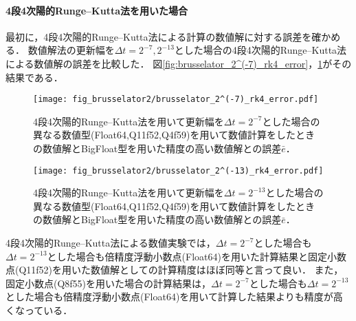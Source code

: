 \paragraph*{4段4次陽的Runge--Kutta法を用いた場合}
最初に，4段4次陽的Runge--Kutta法による計算の数値解に対する誤差を確かめる．
数値解法の更新幅を$\Delta t = 2^{-7},2^{-13}$とした場合の4段4次陽的Runge--Kutta法による数値解の誤差を比較した．
図\ref{fig:brusselator_2^(-7)_rk4_error}，\ref{fig:brusselator_2^(-13)_rk4_error}がその結果である．
\begin{figure}[H]
    \centering
    \begin{minipage}[b]{0.48\columnwidth}
        \centering
        \texttt{[image: fig\_brusselator2/brusselator\_2^(-7)\_rk4\_error.pdf]}
        \caption{4段4次陽的Runge--Kutta法を用いて更新幅を$\Delta t = 2^{-7}$とした場合の異なる数値型(Float64,Q11f52,Q4f59)を用いて数値計算をしたときの数値解とBigFloat型を用いた精度の高い数値解との誤差$\bar{e}$．}
        \label{fig:brusselator_2^(-7)_rk4_error}
    \end{minipage}
    \hspace{0.01\columnwidth}
    \begin{minipage}[b]{0.48\columnwidth}
        \centering
        \texttt{[image: fig\_brusselator2/brusselator\_2^(-13)\_rk4\_error.pdf]}
        \caption{4段4次陽的Runge--Kutta法を用いて更新幅を$\Delta t =  2^{-13}$とした場合の異なる数値型(Float64,Q11f52,Q4f59)を用いて数値計算をしたときの数値解とBigFloat型を用いた精度の高い数値解との誤差$\bar{e}$．}
        \label{fig:brusselator_2^(-13)_rk4_error}
    \end{minipage}
\end{figure}
4段4次陽的Runge--Kutta法による数値実験では，$\Delta t = 2^{-7}$とした場合も$\Delta t =  2^{-13}$とした場合も倍精度浮動小数点(Float64)を用いた計算結果と固定小数点(Q11f52)を用いた数値解としての計算精度はほぼ同等と言って良い．
また，固定小数点(Q8f55)を用いた場合の計算結果は，$\Delta t = 2^{-7}$とした場合も$\Delta t =  2^{-13}$とした場合も倍精度浮動小数点(Float64)を用いて計算した結果よりも精度が高くなっている．


